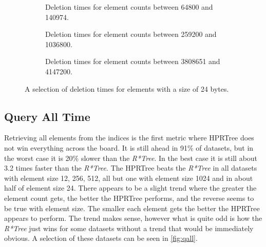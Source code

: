 \begin{figure}[H]
    \centering
    \begin{subfigure}{0.458\textwidth}
        
        \caption[Deletion times for element counts between 64800 and 140974.]{Deletion times for element counts between 64800 and 140974.}
        \label{sfig:delBiggerElement_64800_140974}
    \end{subfigure}\hfill
    \begin{subfigure}{0.458\textwidth}
        
        \caption[Deletion times for element counts between 259200 and 1036800.]{Deletion times for element counts between 259200 and 1036800.}
        \label{sfig:delBiggerElement_259200_1036800}
    \end{subfigure}\hfill
    \begin{subfigure}{0.458\textwidth}
        
        \caption[Deletion times for element counts between 3808651 and 4147200.]{Deletion times for element counts between 3808651 and 4147200.}
        \label{sfig:delBiggerElement_3808651_4147200}
    \end{subfigure}
    \caption[A selection of deletion times for elements with a size of 24 bytes.]{A selection of deletion times for elements with a size of 24 bytes.}
    \label{fig:del}
\end{figure}

\subsection{Query All Time}

Retrieving all elements from the indices is the first metric where \acs{HPRTree} does not win everything across the board. It is still ahead in 91\% of datasets, but in the worst case it is 20\% slower than the \textit{R*Tree}. In the best case it is still about 3.2 times faster than the \textit{R*Tree}. The \acs{HPRTree} beats the \textit{R*Tree} in all datasets with element size 12, 256, 512, all but one with element size 1024 and in about half of element size 24. There appears to be a slight trend where the greater the element count gets, the better the \acs{HPRTree} performs, and the reverse seems to be true with element size. The smaller each element gets the better the \acs{HPRTree} appears to perform. The trend makes sense, however what is quite odd is how the \textit{R*Tree} just wins for some datasets without a trend that would be immediately obvious. A selection of these datasets can be seen in \autoref{fig:qall}.

